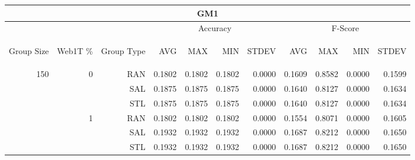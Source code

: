 \begin{center}
\begin{table}[htbp]
\begin{tabular}{ | r | r | r | r | r | r | r | r | r | r | r |}
\hline
\multicolumn{11}{|c|}{GM1}\\
\hline
 & & & \multicolumn{4}{|c|}{Accuracy} & \multicolumn{4}{|c|}{F-Score}\\ \cline{4-11}
\begin{sideways}Group Size\end{sideways} & \begin{sideways}Web1T \%\end{sideways} & \begin{sideways}Group Type\end{sideways} & \begin{sideways}AVG\end{sideways} & \begin{sideways}MAX\end{sideways} & \begin{sideways}MIN\end{sideways} & \begin{sideways}STDEV\end{sideways} & \begin{sideways}AVG\end{sideways} & \begin{sideways}MAX\end{sideways} & \begin{sideways}MIN\end{sideways} & \begin{sideways}STDEV\end{sideways}\\
\hline
\multirow{18}{*}{150}
 & \multirow{3}{*}{0} & RAN & 0.1802 & 0.1802 & 0.1802 & 0.0000 & 0.1609 & 0.8582 & 0.0000 & 0.1599\\ \cline{3-11}
 &   & SAL & 0.1875 & 0.1875 & 0.1875 & 0.0000 & 0.1640 & 0.8127 & 0.0000 & 0.1634\\ \cline{3-11}
 &   & STL & 0.1875 & 0.1875 & 0.1875 & 0.0000 & 0.1640 & 0.8127 & 0.0000 & 0.1634\\ \cline{2-11}
 & \multirow{3}{*}{1} & RAN & 0.1802 & 0.1802 & 0.1802 & 0.0000 & 0.1554 & 0.8071 & 0.0000 & 0.1605\\ \cline{3-11}
 &   & SAL & 0.1932 & 0.1932 & 0.1932 & 0.0000 & 0.1687 & 0.8212 & 0.0000 & 0.1650\\ \cline{3-11}
 &   & STL & 0.1932 & 0.1932 & 0.1932 & 0.0000 & 0.1687 & 0.8212 & 0.0000 & 0.1650\\ \cline{2-11}

\end{tabular}
\end{table}
\end{center}

